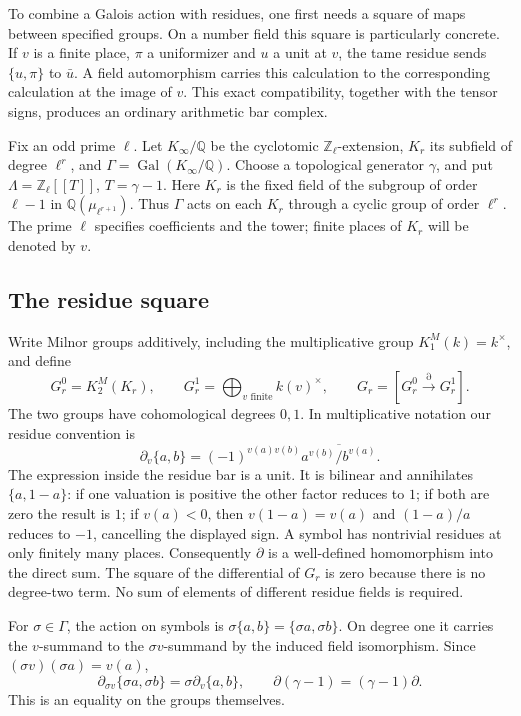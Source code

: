 To combine a Galois action with residues, one first needs a square
of maps between specified groups. On a number field this square is
particularly concrete. If \(v\) is a finite place, \(\pi\) a
uniformizer and \(u\) a unit at \(v\), the tame residue sends
\(\{u,\pi\}\) to \(\bar u\). A field automorphism carries this
calculation to the corresponding calculation at the image of \(v\).
This exact compatibility, together with the tensor signs, produces
an ordinary arithmetic bar complex.

Fix an odd prime \(\ell\). Let \(K_\infty/\mathbb Q\) be the
cyclotomic \(\mathbb Z_\ell\)-extension, \(K_r\) its subfield of
degree \(\ell^r\), and \(\Gamma=\operatorname{Gal}(K_\infty/\mathbb Q)\).
Choose a topological generator \(\gamma\), and put
\(\Lambda=\mathbb Z_\ell[[T]]\), \(T=\gamma-1\).
Here \(K_r\) is the fixed field of the subgroup of order \(\ell-1\)
in \(\mathbb Q(\mu_{\ell^{r+1}})\). Thus \(\Gamma\) acts on each
\(K_r\) through a cyclic group of order \(\ell^r\).
The prime \(\ell\) specifies coefficients and the tower; finite
places of \(K_r\) will be denoted by \(v\).

\subsection{The residue square}

Write Milnor groups additively, including the multiplicative group
\(K_1^M(k)=k^\times\), and define
\[
 G_r^0=K_2^M(K_r),\qquad
 G_r^1=\bigoplus_{v\text{ finite}}k(v)^\times,\qquad
 G_r=[G_r^0\xrightarrow{\partial}G_r^1].
\]
The two groups have cohomological degrees \(0,1\). In multiplicative
notation our residue convention is
\begin{equation}\label{v4-arith:C2:tame-convention}
 \partial_v\{a,b\}
 =(-1)^{v(a)v(b)}\overline{a^{v(b)}/b^{v(a)}}.
\end{equation}
The expression inside the residue bar is a unit. It is bilinear and
annihilates \(\{a,1-a\}\): if one valuation is positive the other
factor reduces to \(1\); if both are zero the result is \(1\);
if \(v(a)<0\), then \(v(1-a)=v(a)\) and \((1-a)/a\) reduces to
\(-1\), cancelling the displayed sign. A symbol has nontrivial
residues at only finitely many places. Consequently \(\partial\)
is a well-defined homomorphism into the direct sum. The square of
the differential of \(G_r\) is zero because there is no degree-two
term. No sum of elements of different residue fields is required.

For \(\sigma\in\Gamma\), the action on symbols is
\(\sigma\{a,b\}=\{\sigma a,\sigma b\}\). On degree one it carries
the \(v\)-summand to the \(\sigma v\)-summand by the induced field
isomorphism. Since \((\sigma v)(\sigma a)=v(a)\),
\begin{equation}\label{v4-arith:C2:equivariant-residue}
 \partial_{\sigma v}\{\sigma a,\sigma b\}
 =\sigma\partial_v\{a,b\},\qquad
 \partial(\gamma-1)=(\gamma-1)\partial.
\end{equation}
This is an equality on the groups themselves.

